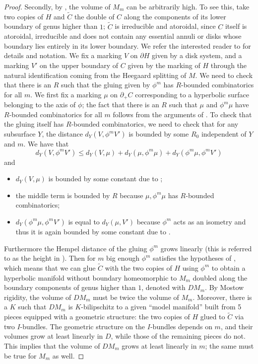 \documentclass[12pt]{amsart}
\theoremstyle{definition}
\begin{document}
\begin{proof}
	Secondly, by \cite[Theorem 8.1]{BMNS}, the volume of $M_m$ can be arbitrarily high. To see this, take two copies of $H$ and $\widetilde{C}$ the double of $C$ along the components of its lower boundary of genus higher than $1$; $\widetilde{C}$ is irreducible and atoroidal, since $C$ itself is atoroidal, irreducible and does not contain any essential annuli or disks whose boundary lies entirely in its lower boundary. We refer the interested reader to \cite{BMNS} for details and notation. We fix a marking $V$ on $\partial H$ given by a disk system, and a marking $V'$ on the upper boundary of $C$ given by the marking of $H$ through the natural identification coming from the Heegaard splitting of $M$. We need to check that there is an $R$ such that the gluing given by $\phi^m$ has $R$-bounded combinatorics for all $m$. We first fix a marking $\mu$ on $\partial_+C$ corresponding to a hyperbolic surface belonging to the axis of $\phi$; the fact that there is an $R$ such that $\mu$ and $\phi^m\mu$ have $R$-bounded combinatorics for all $m$ follows from the arguments of \cite[Section 2.14]{BMNS}. To check that the gluing itself has $R$-bounded combinatorics, we need to check that for any subsurface $Y$, the distance $d_Y(V,\phi^m V')$ is bounded by some $R_0$ independent of $Y$ and $m$. We have that $$d_Y(V,\phi^m V')\leq d_Y(V,\mu)+d_Y(\mu,\phi^m\mu)+d_Y(\phi^m\mu,\phi^m V')$$ and \begin{itemize}
		\item $d_Y(V,\mu)$ is bounded by some constant due to \cite[Theorem 6.12]{MM2};
		\item the middle term is bounded by $R$ because $\mu,\phi^m \mu$ has $R$-bounded combinatorics;
		\item $d_Y(\phi^m\mu,\phi^m V')$ is equal to $d_Y(\mu,V')$ because $\phi^m$ acts as an isometry and thus it is again bounded by some constant due to \cite[Theorem 6.12]{MM2}.
	\end{itemize}
	
	Furthermore the Hempel distance of the gluing $\phi^m$ grows linearly (this is referred to as the height in \cite{BMNS}). Then for $m$ big enough $\phi^m$ satisfies the hypotheses of \cite[Theorem 8.1]{BMNS}, which means that we can glue $\widetilde{C}$ with the two copies of $H$ using $\phi^m$ to obtain a hyperbolic manifold without boundary homeomorphic to $M_m$ doubled along the boundary components of genus higher than $1$, denoted with $DM_m$. By Mostow rigidity, the volume of $DM_m$ must be twice the volume of $M_m$. Moreover, there is a $K$ such that $DM_m$ is $K$-bilipschitz to a given ``model manifold'' built from 5 pieces equipped with a geometric structure: the two copies of $H$ glued to $\widetilde{C}$ via two $I$-bundles. The geometric structure on the $I$-bundles depends on $m$, and their volumes grow at least linearly in $D$, while those of the remaining pieces do not. This implies that the volume of $DM_m$ grows at least linearly in $m$; the same must be true for $M_m$ as well.
	

\end{proof}
\end{document}
